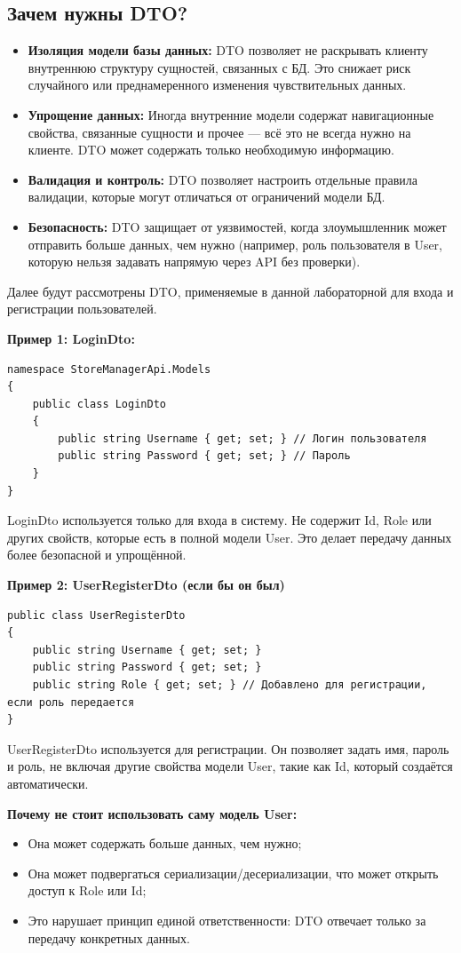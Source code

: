 \documentclass[12pt]{article}
\renewcommand{\texttt}[1]{{\small\ttfamily #1}}
\numberwithin{listing}{section}
\numberwithin{figure}{section}
\begin{document}
\subsection{Зачем нужны DTO?}
\begin{itemize}
	\item \textbf{Изоляция модели базы данных:} DTO позволяет не раскрывать клиенту внутреннюю структуру сущностей, связанных с БД. Это снижает риск случайного или преднамеренного изменения чувствительных данных.
	\item \textbf{Упрощение данных:} Иногда внутренние модели содержат навигационные свойства, связанные сущности и прочее — всё это не всегда нужно на клиенте. DTO может содержать только необходимую информацию.
	\item \textbf{Валидация и контроль:} DTO позволяет настроить отдельные правила валидации, которые могут отличаться от ограничений модели БД.
	\item \textbf{Безопасность:} DTO защищает от уязвимостей, когда злоумышленник может отправить больше данных, чем нужно (например, роль пользователя в User, которую нельзя задавать напрямую через API без проверки).
\end{itemize}
Далее будут рассмотрены DTO, применяемые в данной лабораторной для входа и регистрации пользователей.

\noindent \textbf{Пример 1: \texttt{LoginDto:}}
\begin{verbatim}
namespace StoreManagerApi.Models
{
    public class LoginDto
    {
        public string Username { get; set; } // Логин пользователя
        public string Password { get; set; } // Пароль
    }
}
\end{verbatim}
\texttt{LoginDto} используется только для входа в систему. Не содержит Id, Role или других свойств, которые есть в полной модели User. Это делает передачу данных более безопасной и упрощённой.

\noindent \textbf{Пример 2: \texttt{UserRegisterDto} (если бы он был)}
\begin{verbatim}
public class UserRegisterDto
{
    public string Username { get; set; }
    public string Password { get; set; }
    public string Role { get; set; } // Добавлено для регистрации, если роль передается
}
\end{verbatim}
\texttt{UserRegisterDto} используется для регистрации. Он позволяет задать имя, пароль и роль, не включая другие свойства модели User, такие как Id, который создаётся автоматически.

\noindent \textbf{Почему не стоит использовать саму модель User:}
\begin{itemize}
	\item Она может содержать больше данных, чем нужно;
	\item Она может подвергаться сериализации/десериализации, что может открыть доступ к Role или Id;
	\item Это нарушает принцип единой ответственности: DTO отвечает только за передачу конкретных данных.
\end{itemize}
\end{document}
